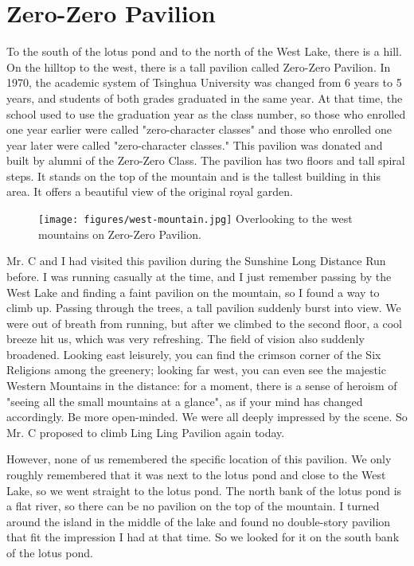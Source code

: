\chapter{Zero-Zero Pavilion}

To the south of the lotus pond and to the north of the West Lake, there is a
hill. On the hilltop to the west, there is a tall pavilion called Zero-Zero
Pavilion.  In 1970, the academic system of Tsinghua University was changed from
6 years to 5 years, and students of both grades graduated in the same year.  At
that time, the school used to use the graduation year as the class number, so
those who enrolled one year earlier were called "zero-character classes" and
those who enrolled one year later were called "zero-character classes." This
pavilion was donated and built by alumni of the Zero-Zero Class.  The pavilion
has two floors and tall spiral steps. It stands on the top of the mountain and
is the tallest building in this area. It offers a beautiful view of the
original royal garden.

\begin{figure}[!b]
	\centering
	\texttt{[image: figures/west-mountain.jpg]}
	Overlooking to the west mountains on Zero-Zero Pavilion.
\end{figure}

Mr. C and I had visited this pavilion during the Sunshine Long Distance Run
before.  I was running casually at the time, and I just remember passing by the
West Lake and finding a faint pavilion on the mountain, so I found a way to
climb up. Passing through the trees, a tall pavilion suddenly burst into view.
We were out of breath from running, but after we climbed to the second floor, a
cool breeze hit us, which was very refreshing.  The field of vision also
suddenly broadened. Looking east leisurely, you can find the crimson corner of
the Six Religions among the greenery; looking far west, you can even see the
majestic Western Mountains in the distance: for a moment, there is a sense of
heroism of "seeing all the small mountains at a glance", as if your mind has
changed accordingly. Be more open-minded.  We were all deeply impressed by the
scene. So Mr. C proposed to climb Ling Ling Pavilion again today.

However, none of us remembered the specific location of this pavilion. We only
roughly remembered that it was next to the lotus pond and close to the West
Lake, so we went straight to the lotus pond.  The north bank of the lotus pond
is a flat river, so there can be no pavilion on the top of the mountain. I
turned around the island in the middle of the lake and found no double-story
pavilion that fit the impression I had at that time.  So we looked for it on
the south bank of the lotus pond.

